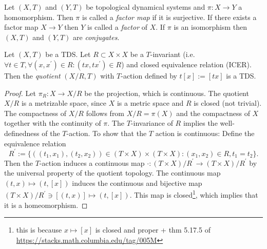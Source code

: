 \begin{definition}
	Let $(X, T)$ and $(Y, T)$ be topological dynamical systems and $\pi: X \to Y$ a homomorphism. Then $\pi$ is called a \emph{factor map} if it is surjective.
	If there exists a factor map $X \to Y$ then $Y$ is called a \emph{factor} of $X$. If $\pi$ is an isomorphism then $(X, T)$ and $(Y, T)$ are \emph{conjugates}.
\end{definition}

\begin{proposition}
	Let $(X, T)$ be a TDS. Let $R \subset X \times X$ be a $T$-invariant (i.e. $\forall t \in T, \forall (x, x^\prime ) \in R : (tx, tx^\prime) \in R$) and closed equivalence relation (ICER). Then the \emph{quotient} $(X/R, T)$ with $T$-action defined by $t[x] := [tx]$ is a TDS.
\end{proposition}
\begin{proof}
	Let $\pi_R: X \to X/R$ be the projection, which is continuous. The quotient $X/R$ is a metrizable space, since $X$ is a metric space and $R$ is closed (not trivial). The compactness of $X/R$ follows from $X/R = \pi(X)$ and the compactness of $X$ together with the continuity of $\pi$. The $T$-invariance of $R$ implies the well-definedness of the $T$-action. To show that the $T$ action is continuous: Define the equivalence relation
	\begin{equation*}
		R^\prime := \{ ((t_1,x_1), (t_2,x_2)) \in (T \times X) \times (T \times X): (x_1, x_2) \in R, t_1 = t_2\}.
	\end{equation*}
	Then the $T$-action induces a continuous map $\cdot : (T \times X)/R^\prime \to (T\times X)/R^\prime$ by the universal property of the quotient topology. The continuous map $(t, x) \mapsto (t, [x])$ induces the continuous and bijective map $(T\times X)/R^\prime \ni [(t, x)] \mapsto (t, [x])$. This map is closed\footnote{this is because $x \mapsto [x]$ is closed and proper + thm 5.17.5 of \url{https://stacks.math.columbia.edu/tag/005M}}, which implies that it is a homeomorphism.
\end{proof}

